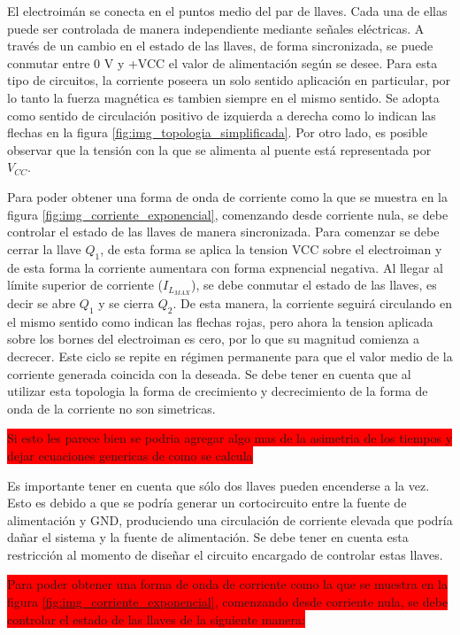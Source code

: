 El electroimán se conecta en el puntos medio del par de llaves. Cada una de ellas puede ser controlada de manera independiente mediante señales eléctricas. A través de un cambio en el estado de las llaves, de forma sincronizada, se puede conmutar entre 0 V y +VCC el valor de alimentación según se desee. Para esta tipo de circuitos, la corriente poseera un solo sentido aplicación en particular, por lo tanto la fuerza magnética es tambien siempre en el mismo sentido. Se adopta como sentido de circulación positivo de izquierda a derecha como lo indican las flechas en la figura \ref{fig:img_topologia_simplificada}. Por otro lado, es posible observar que la tensión con la que se alimenta al puente está representada por $V_{CC}$.

Para poder obtener una forma de onda de corriente como la que se muestra en la figura \ref{fig:img_corriente_exponencial}, comenzando desde corriente nula, se debe controlar el estado de las llaves de manera sincronizada. Para comenzar se debe cerrar la llave  $Q_1$, de esta forma se aplica la tension VCC sobre el electroiman y de esta forma la corriente aumentara con forma expnencial negativa. Al llegar al límite superior de corriente ($I_{L_{MAX}}$), se debe conmutar el estado de las llaves, es decir se abre $Q_1$ y se cierra $Q_2$. De esta manera, la corriente seguirá circulando en el mismo sentido como indican las flechas rojas, pero ahora la tension aplicada sobre los bornes del electroiman es cero, por lo que su magnitud comienza a decrecer. Este ciclo se repite en régimen permanente para que el valor medio de la corriente generada coincida con la deseada. Se debe tener en cuenta que al utilizar esta topologia la forma de crecimiento y decrecimiento de la forma de onda de la corriente no son simetricas. 

\colorbox{red}{Si esto les parece bien se podria agregar algo mas de la asimetria de los tiempos y dejar ecuaciones genericas de como se calcula}

Es importante tener en cuenta que sólo dos llaves pueden encenderse a la vez. Esto es debido a que se podría generar un cortocircuito entre la fuente de alimentación y GND, produciendo una circulación de corriente elevada que podría dañar el sistema y la fuente de alimentación. Se debe tener en cuenta esta restricción al momento de diseñar el circuito encargado de controlar estas llaves.

\colorbox{red}{Para poder obtener una forma de onda de corriente como la que se muestra en la figura \ref{fig:img_corriente_exponencial}, comenzando desde corriente nula, se debe controlar el estado de las llaves de la siguiente manera:}

